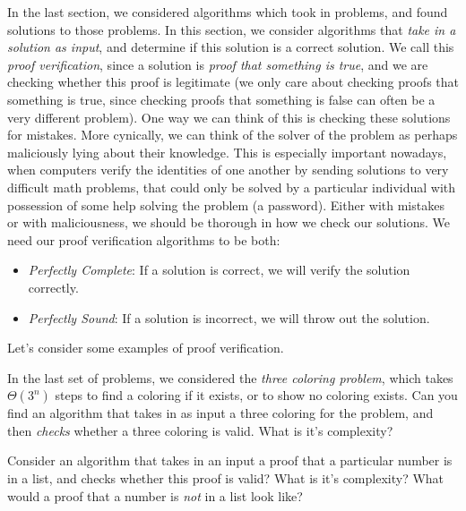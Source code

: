 \documentclass[answers]{exam}
\begin{document}
In the last section, we considered algorithms which took in problems, and found solutions to those problems. In this section, we consider algorithms that \emph{take in a solution as input}, and determine if this solution is a correct solution. We call this \emph{proof verification}, since a solution is \emph{proof that something is true}, and we are checking whether this proof is legitimate (we only care about checking proofs that something is true, since checking proofs that something is false can often be a very different problem). One way we can think of this is checking these solutions for mistakes. More cynically, we can think of the solver of the problem as perhaps maliciously lying about their knowledge. This is especially important nowadays, when computers verify the identities of one another by sending solutions to very difficult math problems, that could only be solved by a particular individual with possession of some help solving the problem (a password). Either with mistakes or with maliciousness, we should be thorough in how we check our solutions. We need our proof verification algorithms to be both:
%
\begin{itemize}
    \item \emph{Perfectly Complete}: If a solution is correct, we will verify the solution correctly.

    \item \emph{Perfectly Sound}: If a solution is incorrect, we will throw out the solution.
\end{itemize}
%
Let's consider some examples of proof verification.

\begin{questions}

	\question In the last set of problems, we considered the \emph{three coloring problem}, which takes $\Theta(3^n)$ steps to find a coloring if it exists, or to show no coloring exists. Can you find an algorithm that takes in as input a three coloring for the problem, and then \emph{checks} whether a three coloring is valid. What is it's complexity? 

	\question Consider an algorithm that takes in an input a proof that a particular number is in a list, and checks whether this proof is valid? What is it's complexity? What would a proof that a number is \emph{not} in a list look like?
\end{questions}
\end{document}
